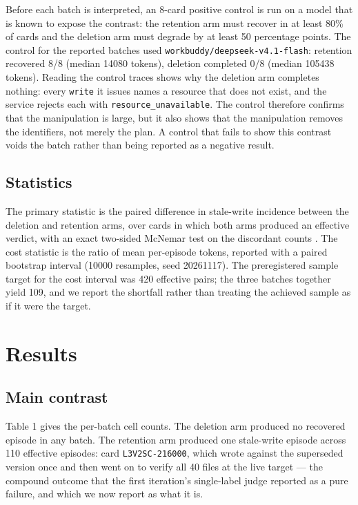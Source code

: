 \documentclass[11pt]{article}
\begin{document}
\begin{sloppypar}
Before each batch is interpreted, an 8-card positive control is run on a model that is known to expose the contrast: the retention arm must recover in at least 80\% of cards and the deletion arm must degrade by at least 50 percentage points. The control for the reported batches used \texttt{workbuddy/deepseek-v4.1-flash}: retention recovered 8/8 (median 14080 tokens), deletion completed 0/8 (median 105438 tokens). Reading the control traces shows why the deletion arm completes nothing: every \texttt{write} it issues names a resource that does not exist, and the service rejects each with \texttt{resource\_unavailable}. The control therefore confirms that the manipulation is large, but it also shows that the manipulation removes the identifiers, not merely the plan. A control that fails to show this contrast voids the batch rather than being reported as a negative result.

\subsection{Statistics}

The primary statistic is the paired difference in stale-write incidence between the deletion and retention arms, over cards in which both arms produced an effective verdict, with an exact two-sided McNemar test on the discordant counts \cite{peyrard2021paired,yang2023mcnemar}. The cost statistic is the ratio of mean per-episode tokens, reported with a paired bootstrap interval (10000 resamples, seed 20261117). The preregistered sample target for the cost interval was 420 effective pairs; the three batches together yield 109, and we report the shortfall rather than treating the achieved sample as if it were the target.

\section{Results}

\subsection{Main contrast}

Table 1 gives the per-batch cell counts. The deletion arm produced no recovered episode in any batch. The retention arm produced one stale-write episode across 110 effective episodes: card \texttt{L3V2SC-216000}, which wrote against the superseded version once and then went on to verify all 40 files at the live target --- the compound outcome that the first iteration's single-label judge reported as a pure failure, and which we now report as what it is.


\end{sloppypar}
\end{document}
